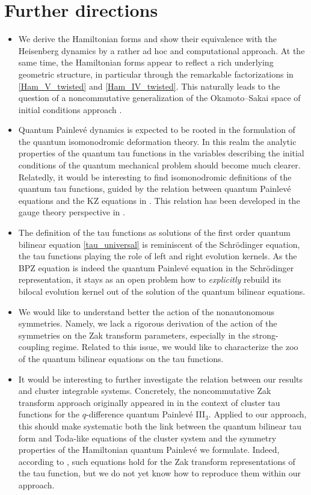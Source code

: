 \documentclass[12pt,a4paper]{article}
\numberwithin{equation}{section}
\begin{document}
\section{Further directions}
\label{sec:further}
\begin{itemize}
    \item We derive the Hamiltonian forms and show their equivalence with the Heisenberg dynamics by a rather ad hoc and computational approach.
    At the same time, the Hamiltonian forms appear to reflect a rich underlying geometric structure, in particular through the remarkable factorizations in \eqref{Ham_V_twisted} and \eqref{Ham_IV_twisted}.
    This naturally leads to the question of a noncommutative generalization of the Okamoto--Sakai space of initial conditions approach \cite{S01}.

    \item Quantum Painlev\'e dynamics is expected to be rooted in the formulation of the quantum isomonodromic deformation theory. In this realm the analytic properties of the quantum tau functions in the variables describing the initial conditions of the quantum mechanical problem should become much clearer. Relatedly, it would be interesting to find isomonodromic definitions of the quantum tau functions, guided by the relation between quantum Painlev\'e equations and the KZ equations in \cite{JNS08,gaiur2023}.
    This relation has been developed in the gauge theory perspective in \cite{Nekrasov:2020qcq}.
    
    \item 
     The definition of the tau functions as solutions of the first order quantum bilinear equation  \eqref{tau_universal} is reminiscent of the Schr\"odinger equation, the tau functions playing the role of left and right evolution kernels.
    As the BPZ equation is indeed the quantum Painlev\'e equation in the Schr\"odinger representation, it stays as an open problem how to {\it explicitly} rebuild its bilocal evolution kernel out of the solution of the quantum bilinear equations.

    \item We would like to understand better the action of the nonautonomous symmetries. Namely, we lack a rigorous derivation of the action of the symmetries on the Zak transform parameters, especially in the strong-coupling regime. Related to this issue, we would like to characterize the zoo of the quantum bilinear equations on the tau functions.
 
    \item It would be interesting to further investigate the relation between our results and cluster integrable systems.
    Concretely, the noncommutative Zak transform approach originally appeared in \cite{BGM17} in the context of cluster tau functions for the $q$-difference quantum Painlev\'e III$_3$. 
    Applied to our approach, this should make systematic both the link between the quantum bilinear tau form and Toda-like equations of the cluster system and
    the symmetry properties of the Hamiltonian quantum Painlev\'e we formulate.
    Indeed, according to \cite{BGM17, GMS20}, such equations hold for the Zak transform representations of the tau function, but we do not yet know how to reproduce them within our approach.


\end{itemize}
\end{document}
